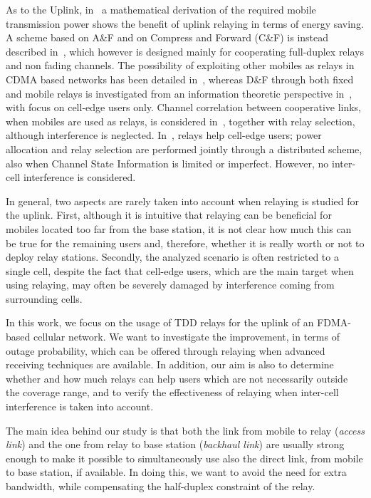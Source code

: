 \documentclass[12pt, letterpaper, onecolumn, draftcls]{IEEEtran}
\begin{document}
As to the Uplink, in~\cite{cell_ULrel} a mathematical derivation of the required mobile transmission power shows the benefit of uplink relaying in terms of energy saving. A scheme based on A\&F and on Compress and Forward (C\&F) is instead described in~\cite{cell_UL_fulldup}, which however is designed mainly for cooperating full-duplex relays and non fading channels.
The possibility of exploiting other mobiles as relays in CDMA based networks has been detailed in~\cite{cell_UL_CDMA}, whereas D\&F through both fixed and mobile relays is investigated from an information theoretic perspective in~\cite{cell_UL_bord}, with focus on cell-edge users only.
Channel correlation between cooperative links, when mobiles are used as relays, is considered in~\cite{cell_UL_corr}, together with relay selection, although interference is neglected. In~\cite{Pow_RelSel}, relays help cell-edge users; power allocation and relay selection are performed jointly through a distributed scheme, also when Channel State Information is limited or imperfect. However, no inter-cell interference is considered.

In general, two aspects are rarely taken into account when relaying is studied for the uplink.
First, although it is intuitive that relaying can be beneficial for mobiles located too far from the base station, it is not clear how much this can be true for the remaining users and, therefore, whether it is really worth or not to deploy relay stations. Secondly, the analyzed scenario is often restricted to a single cell, despite the fact that cell-edge users, which are the main target when using relaying, may often be severely damaged by interference coming from surrounding cells.

In this work, we focus on the usage of TDD relays for the uplink of an FDMA-based cellular network. We want to investigate the improvement, in terms of outage probability, which can be offered through relaying when advanced receiving techniques are available. In addition, our aim is also to determine whether and how much relays can help users which are not necessarily outside the coverage range, and to verify the effectiveness of relaying when inter-cell interference is taken into account.

The main idea behind our study is that both the link from mobile to relay (\textit{access link}) and the one from relay to base station (\textit{backhaul link}) are usually strong enough to make it possible to simultaneously use also the direct link, from mobile to base station, if available. In doing this, we want to avoid the need for extra bandwidth, while compensating the half-duplex constraint of the relay.
\end{document}
